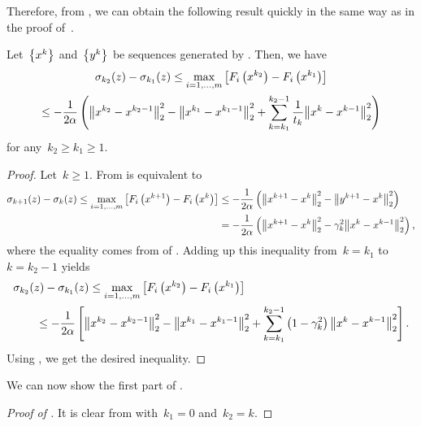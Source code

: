 \documentclass[../main]{subfiles}
\begin{document}
Therefore, from , we can obtain the following result quickly in the same way as in the proof of~\cite[Corollary 5.1]{Tanabe2022a}.
\begin{lemma} 
    Let~$\set*{x^k}$ and~$\set*{y^k}$ be sequences generated by .
    Then, we have
    \begin{multline}
        \sigma_{k_2}(z) - \sigma_{k_1}(z) \le \max_{i = 1, \dots, m} \left[ F_i\left(x^{k_2}\right) - F_i\left( x^{k_1} \right)  \right] \\
        \le - \frac{1}{2 \alpha} \left( \norm*{x^{k_2} - x^{k_2 - 1}}_2^2 - \norm*{x^{k_1} - x^{k_1 - 1}}_2^2 + \sum_{k = k_1}^{k_2 - 1} \frac{1}{t_k} \norm*{x^k - x^{k - 1}}_2^2 \right)
    \end{multline}
    for any~$k_2 \ge k_1 \ge 1$.
\end{lemma}
\begin{proof}
    Let~$k \ge 1$.
    From  is equivalent to
    \begin{align}
        \sigma_{k + 1}(z) - \sigma_k(z) \le \max_{i = 1, \dots, m} \left[ F_i\left(x^{k + 1}\right) - F_i\left( x^k \right) \right]  &\le - \frac{1}{2 \alpha} \left( \norm*{x^{k + 1} - x^k}_2^2 - \norm*{y^{k + 1} - x^k}_2^2 \right) \\
                                        &= - \frac{1}{2 \alpha} \left( \norm*{x^{k + 1} - x^k}_2^2 - \gamma_k^2 \norm*{x^k - x^{k - 1}}_2^2 \right)
    ,\end{align}
    where the equality comes from  of .
    Adding up this inequality from~$k = k_1$ to~$k = k_2 - 1$ yields
    \begin{align}
        \MoveEqLeft \sigma_{k_2}(z) - \sigma_{k_1}(z) \le \max_{i = 1, \dots, m} \left[ F_i\left( x^{k_2} \right) - F_i\left( x^{k_1} \right)  \right] \\
        &\le - \frac{1}{2 \alpha} \left[ \norm*{x^{k_2} - x^{k_2 - 1}}_2^2 - \norm*{x^{k_1} - x^{k_1 - 1}}_2^2 + \sum_{k = k_1}^{k_2 - 1} \left( 1 - \gamma_k^2 \right) \norm*{x^k - x^{k - 1}}_2^2 \right] 
    .\end{align}
    Using , we get the desired inequality.
\end{proof}

We can now show the first part of .
\begin{proof}[Proof of ]
    It is clear from  with~$k_1 = 0$ and~$k_2 = k$.
\end{proof}
\end{document}
